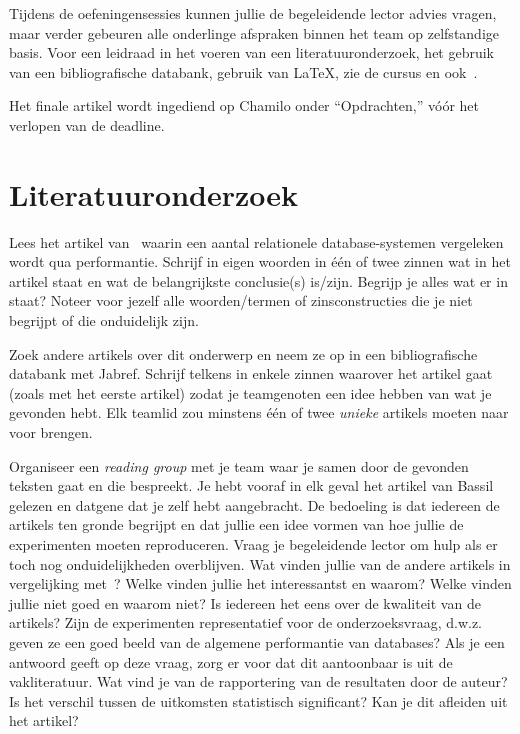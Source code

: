 \documentclass[fleqn,10pt]{voorstel}
\begin{document}
Tijdens de oefeningensessies kunnen jullie de begeleidende lector advies vragen, maar verder gebeuren alle onderlinge afspraken binnen het team op zelfstandige basis. Voor een leidraad in het voeren van een literatuuronderzoek, het gebruik van een bibliografische databank, gebruik van \LaTeX{}, zie de cursus en ook~\autocite{VanVreckem2017}.

Het finale artikel wordt ingediend op Chamilo onder ``Opdrachten,'' vóór het verlopen van de deadline.


\section{Literatuuronderzoek}

Lees het artikel van~\textcite{Bassil2012} waarin een aantal relationele database-systemen vergeleken wordt qua performantie. Schrijf in eigen woorden in één of twee zinnen wat in het artikel staat en wat de belangrijkste conclusie(s) is/zijn. Begrijp je alles wat er in staat? Noteer voor jezelf alle woorden/termen of zinsconstructies die je niet begrijpt of die onduidelijk zijn.

Zoek andere artikels over dit onderwerp en neem ze op in een bibliografische databank met Jabref. Schrijf telkens in enkele zinnen waarover het artikel gaat (zoals met het eerste artikel) zodat je teamgenoten een idee hebben van wat je gevonden hebt. Elk teamlid zou minstens één of twee \emph{unieke} artikels moeten naar voor brengen.

Organiseer een \emph{reading group} met je team waar je samen door de gevonden teksten gaat en die bespreekt. Je hebt vooraf in elk geval het artikel van Bassil gelezen en datgene dat je zelf hebt aangebracht. De bedoeling is dat iedereen de artikels ten gronde begrijpt en dat jullie een idee vormen van hoe jullie de experimenten moeten reproduceren. Vraag je begeleidende lector om hulp als er toch nog onduidelijkheden overblijven. Wat vinden jullie van de andere artikels in vergelijking met~\textcite{Bassil2012}? Welke vinden jullie het interessantst en waarom? Welke vinden jullie niet goed en waarom niet? Is iedereen het eens over de kwaliteit van de artikels? Zijn de experimenten representatief voor de onderzoeksvraag, d.w.z. geven ze een goed beeld van de algemene performantie van databases? Als je een antwoord geeft op deze vraag, zorg er voor dat dit aantoonbaar is uit de vakliteratuur. Wat vind je van de rapportering van de resultaten door de auteur? Is het verschil tussen de uitkomsten statistisch significant? Kan je dit afleiden uit het artikel?
\end{document}
